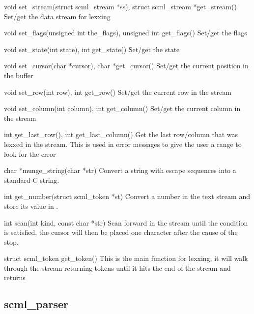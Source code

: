 \begin{cprototypelist}
  \item[void set_stream(struct scml_stream *ss), struct scml_stream
  *get_stream()] Set/get the data stream for lexxing

  \item[void set_flags(unsigned int the_flags),
		    unsigned int get_flags()] Set/get the flags

  \item[void set_state(int state), int get_state()] Set/get the
  state

  \item[void set_cursor(char *cursor), char *get_cursor()] Set/get
  the current position in the  buffer

  \item[void set_row(int row), int get_row()] Set/get the current
  row in the stream

  \item[void set_column(int column), int get_column()] Set/get the
  current column in the stream

  \item[int get_last_row(), int get_last_column()] Get the last
  row/column that was lexxed in the stream.  This is used in error messages to
  give the user a range to look for the error

  \item[char *munge_string(char *str)] Convert a string with
  escape sequences into a standard C string.

  \item[int get_number(struct scml_token *st)] Convert a number in the text
  stream and store its value in .

  \item[int scan(int kind, const char *str)] Scan forward in the
  stream until the condition is satisfied, the cursor will then be placed one
  character after the cause of the stop.

  \item[struct scml_token get_token()] This is the main function
  for lexxing, it will walk through the stream returning tokens until it hits
  the end of the stream and returns 
\end{cprototypelist}

\subsection{scml\_parser}

